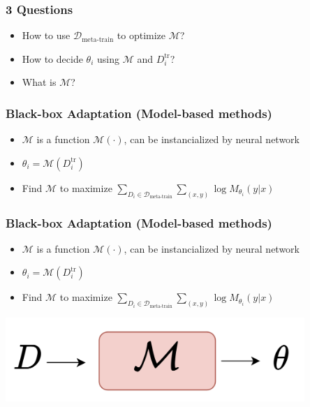 \documentclass{beamer}
\begin{document}
\begin{frame}[t]
  \frametitle{3 Questions}

  \begin{itemize}
    \item How to use $\mathcal{D}_{\text{meta-train}}$ to optimize $\mathcal{M}$?
    \item How to decide $\theta_i$ using $\mathcal{M}$ and $D_{i}^{\text{tr}}$?
    \item What is $\mathcal{M}$?
  \end{itemize}
\end{frame}

\begin{frame}[t]
  \frametitle{Black-box Adaptation (Model-based methods)}
  
  \begin{itemize}
      \item $\mathcal{M}$ is a function $\mathcal{M}(\cdot)$, can be instancialized by neural network
    \item $\theta_i = \mathcal{M}(D_{i}^{\text{tr}})$
    \item Find $\mathcal{M}$ to maximize $\sum_{D_i \in \mathcal{D}_{\text{meta-train}}}\sum_{(x,y)} \log M_{\theta_i}(y|x)$ 
  \end{itemize}

\end{frame}

\begin{frame}[t]
  \frametitle{Black-box Adaptation (Model-based methods)}
  
  \begin{itemize}
    \item $\mathcal{M}$ is a function $\mathcal{M}(\cdot)$, can be instancialized by neural network
    \item $\theta_i = \mathcal{M}(D_{i}^{\text{tr}})$
    \item Find $\mathcal{M}$ to maximize $\sum_{D_i \in \mathcal{D}_{\text{meta-train}}}\sum_{(x,y)} \log M_{\theta_i}(y|x)$ 
  \end{itemize}

  \center \includegraphics[width=0.85\textwidth]{fig/meta_learning.png}
\end{frame}
\end{document}
